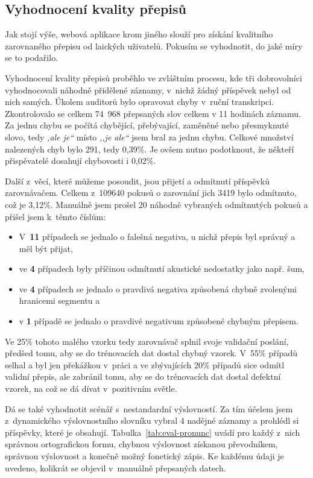\subsection{Vyhodnocení kvality přepisů}

Jak stojí výše, webová aplikace krom jiného slouží pro získání kvalitního
zarovnaného přepisu od laických uživatelů. Pokusím se vyhodnotit, do jaké míry
se to podařilo.

Vyhodnocení kvality přepisů proběhlo ve zvláštním procesu, kde tři dobrovolníci
vyhodnocovali náhodně přidělené záznamy, v~nichž žádný příspěvek nebyl od nich
samých. Úkolem auditorů bylo opravovat chyby v~ruční transkripci. Zkontrolovalo
se celkem 74~968 přepsaných slov celkem v 11 hodinách záznamu. Za jednu chybu se počítá
chybějící, přebývající, zaměněné nebo přesmyknuté slovo, tedy \textit{,ale je``} místo
\textit{,,je ale``} jsem bral za jednu chybu. Celkové množství nalezených chyb
bylo 291, tedy 0,39\%. Je ovšem nutno podotknout, že někteří přispěvatelé
dosahují chybovosti i 0,02\%.

Další z~věcí, které můžeme posoudit, jsou přijetí a odmítnutí příspěvků
zarovnávačem. Celkem z~109640 pokusů o zarovnání jich 3419 bylo odmítnuto, což
je 3,12\%. Manuálně jsem prošel 20 náhodně vybraných odmítnutých pokusů a
přišel jsem k~těmto číslům:
\begin{itemize}
\item{
    V~\textbf{11} případech se jednalo o falešná negativa, u nichž přepis byl
    správný a měl být přijat,
}
\item{
    ve \textbf{4} případech byly příčinou odmítnutí akustické nedostatky jako
    např. šum,
}
\item{
    ve \textbf{4} případech se jednalo o pravdivá negativa způsobená chybně
    zvolenými hranicemi segmentu a
}
\item{
     v \textbf{1} případě se jednalo o pravdivé negativum způsobené chybným
    přepisem.
}
\end{itemize}

Ve 25\% tohoto malého vzorku tedy zarovnávač splnil svoje validační
poslání, předšed tomu, aby se do trénovacích dat dostal chybný vzorek. V~55\%
případů selhal a byl jen překážkou v~práci a ve zbývajících 20\%
případů sice odmítl validní přepis, ale zabránil tomu, aby se do trénovacích dat
dostal defektní vzorek, na což se dá dívat v~pozitivním světle.

Dá se také vyhodnotit scénář s~nestandardní výslovností. Za tím účelem jsem
z~dynamického výslovnostního slovníku vybral 4 nadějné záznamy a prohlédl si
příspěvky, které je obsahují. Tabulka~\ref{tab:eval-pronunc} uvádí pro každý
z~nich správnou ortografickou formu, chybnou výslovnost získanou převodníkem,
správnou výslovnost a konečně možný fonetický zápis. Ke každému údaji je uvedeno,
kolikrát se objevil v~manuálně přepsaných datech.

